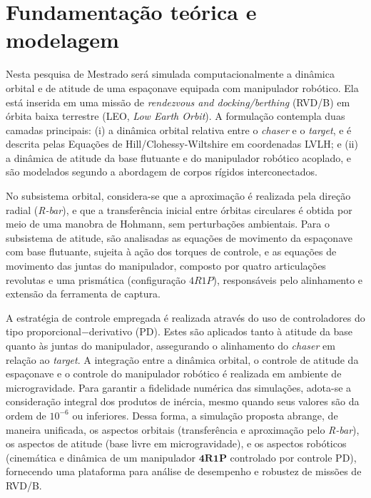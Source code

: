 \chapter{Fundamentação teórica e modelagem}

Nesta pesquisa de Mestrado será simulada computacionalmente a dinâmica orbital e de atitude de uma espaçonave equipada com manipulador robótico.
Ela está inserida em uma missão de \emph{rendezvous and docking/berthing} (RVD/B) em órbita baixa terrestre (LEO, \emph{Low Earth Orbit}).
A formulação contempla duas camadas principais:
(i) a dinâmica orbital relativa entre o \emph{chaser} e o \emph{target}, e é descrita pelas Equações de Hill/Clohessy-Wiltshire em coordenadas LVLH; e
(ii) a dinâmica de atitude da base flutuante e do manipulador robótico acoplado, e são modelados segundo a abordagem de corpos rígidos interconectados.

No subsistema orbital, considera-se que a aproximação é realizada pela direção radial (\emph{R-bar}), e que a transferência inicial entre órbitas circulares é obtida por meio de uma manobra de Hohmann, sem perturbações ambientais.
Para o subsistema de atitude, são analisadas as equações de movimento da espaçonave com base flutuante, sujeita à ação dos torques de controle, e as equações de movimento das juntas do manipulador, composto por quatro articulações revolutas e uma prismática (configuração $4R1P$), responsáveis pelo alinhamento e extensão da ferramenta de captura.

A estratégia de controle empregada é realizada através do uso de controladores do tipo proporcional$-$derivativo (PD).
Estes são aplicados tanto à atitude da base quanto às juntas do manipulador, assegurando o alinhamento do \emph{chaser} em relação ao \emph{target}.
A integração entre a dinâmica orbital, o controle de atitude da espaçonave e o controle do manipulador robótico é realizada em ambiente de microgravidade.
Para garantir a fidelidade numérica das simulações, adota-se a consideração integral dos produtos de inércia, mesmo quando seus valores são da ordem de $10^{-6}$ ou inferiores.
Dessa forma, a simulação proposta abrange, de maneira unificada, os aspectos orbitais (transferência e aproximação pelo \emph{R-bar}), os aspectos de atitude (base livre em microgravidade), e os aspectos robóticos (cinemática e dinâmica de um manipulador $\mathbf{4R1P}$ controlado por controle PD), fornecendo uma plataforma para análise de desempenho e robustez de missões de RVD/B.


